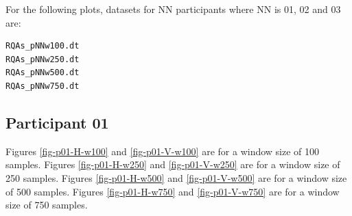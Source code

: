 \documentclass[12pt]{article}
\begin{document}
For the following plots, datasets for NN participants where NN is 01, 02 and 03 are:
\begin{verbatim}
RQAs_pNNw100.dt
RQAs_pNNw250.dt
RQAs_pNNw500.dt
RQAs_pNNw750.dt
\end{verbatim}


\subsection{Participant 01}

Figures \ref{fig-p01-H-w100} and \ref{fig-p01-V-w100} are for a window size of 100 samples.
Figures \ref{fig-p01-H-w250} and \ref{fig-p01-V-w250} are for a window size of 250 samples.
Figures \ref{fig-p01-H-w500} and \ref{fig-p01-V-w500} are for a window size of 500 samples.
Figures \ref{fig-p01-H-w750} and \ref{fig-p01-V-w750} are for a window size of 750 samples.

\end{document}
